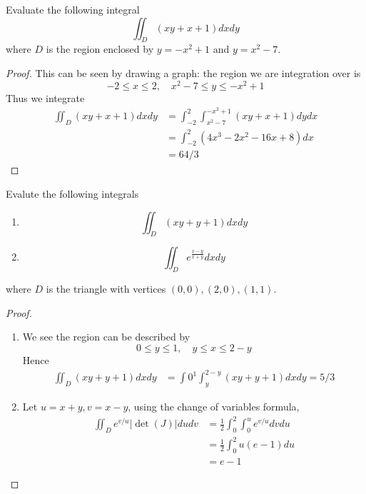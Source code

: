 \documentclass[openany]{book}
\begin{document}
\begin{prob}
    Evaluate the following integral 
    \begin{equation*}
        \iint_D (xy+x+1) dxdy
    \end{equation*}
    where $D$ is the region enclosed by $y=-x^2+1$ and $y=x^2-7$.
\end{prob}
\begin{proof}
    This can be seen by drawing a graph: the region we are integration over is 
    \begin{equation*}
        -2\leq x\leq 2, \quad x^2-7\leq y\leq -x^2+1
    \end{equation*}
    Thus we integrate 
    \begin{align*}
        \iint_D (xy+x+1)dxdy&=\int_{-2}^2\int_{x^2-7}^{-x^2+1}(xy+x+1)dydx\\
        &=\int_{-2}^2(4x^3-2x^2-16x+8)dx\\
        &=64/3
    \end{align*}
\end{proof}







\begin{prob}
    Evalute the following integrals
    \begin{enumerate}
        \item \begin{equation*}
            \iint_D (xy+y+1) dxdy
        \end{equation*}
        \item \begin{equation*}
            \iint_D e^\frac{x-y}{x+y}dxdy
        \end{equation*}
    \end{enumerate}
    where $D$ is the triangle with vertices $(0,0), (2,0), (1,1)$.
\end{prob}
\begin{proof}
    \begin{enumerate}
        \item We see the region can be described by 
        \begin{equation*}
            0\leq y\leq 1, \quad y\leq x\leq 2-y
        \end{equation*}
        Hence 
        \begin{align*}
            \iint_D (xy+y+1) dxdy&=\int0^1\int_y^{2-y}(xy+y+1)dxdy=5/3
        \end{align*}
        \item Let $u=x+y, v=x-y$, using the change of variables formula,
        \begin{align*}
            \iint_D e^{v/u}|\det(J)|dudv&=\frac{1}{2}\int_0^2\int_0^u e^{v/u}dvdu\\
            &=\frac{1}{2}\int_0^2 u(e-1)du\\
            &=e-1
        \end{align*}
    \end{enumerate}
\end{proof}
\end{document}
